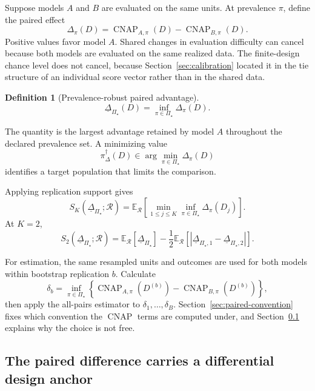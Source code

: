 \documentclass[11pt]{article}
\newcommand{\CNAP}{\operatorname{CNAP}}
\newcommand{\Regime}{\mathcal{R}}
\newcommand{\PSet}{\Pi_\star}
\newcommand{\E}{\mathbb{E}}
\newcommand{\RobDelta}{\underline{\Delta}_{\PSet}}
\newtheorem{definition}{Definition}
\theoremstyle{remark}
\begin{document}
Suppose models $A$ and $B$ are evaluated on the same units. At prevalence $\pi$, define the paired effect
\begin{equation}
\Delta_\pi(D)
=
\CNAP_{A,\pi}(D)
-
\CNAP_{B,\pi}(D).
\label{eq:paired-effect}
\end{equation}
Positive values favor model $A$. Shared changes in evaluation difficulty can cancel because both models are evaluated on the same realized data. The finite-design chance level does not cancel, because Section~\ref{sec:calibration} located it in the tie structure of an individual score vector rather than in the shared data.

\begin{definition}[Prevalence-robust paired advantage]
\begin{equation}
\RobDelta(D)
=
\inf_{\pi\in\PSet}
\Delta_\pi(D).
\label{eq:robust-paired-effect}
\end{equation}
\end{definition}

The quantity is the largest advantage retained by model $A$ throughout the declared prevalence set. A minimizing value
\[
\pi_\Delta^\dagger(D)
\in
\arg\min_{\pi\in\PSet}\Delta_\pi(D)
\]
identifies a target population that limits the comparison.

Applying replication support gives
\begin{equation}
S_K(\RobDelta;\Regime)
=
\E_{\Regime}
\left[
\min_{1\leq j\leq K}
\inf_{\pi\in\PSet}
\Delta_\pi(D_j)
\right].
\label{eq:robust-paired-support}
\end{equation}
At $K=2$,
\begin{equation}
S_2(\RobDelta;\Regime)
=
\E_{\Regime}[\RobDelta]
-
\frac12
\E_{\Regime}
\left[
|\underline{\Delta}_{\PSet,1}-\underline{\Delta}_{\PSet,2}|
\right].
\label{eq:robust-paired-k2}
\end{equation}

For estimation, the same resampled units and outcomes are used for both models within bootstrap replication $b$. Calculate
\[
\delta_b
=
\inf_{\pi\in\PSet}
\left\{
\CNAP_{A,\pi}(D^{(b)})
-
\CNAP_{B,\pi}(D^{(b)})
\right\},
\]
then apply the all-pairs estimator to $\delta_1,\ldots,\delta_B$. Section~\ref{sec:paired-convention} fixes which convention the $\CNAP$ terms are computed under, and Section~\ref{sec:paired-anchor} explains why the choice is not free.

\subsection{The paired difference carries a differential design anchor}
\label{sec:paired-anchor}
\end{document}
